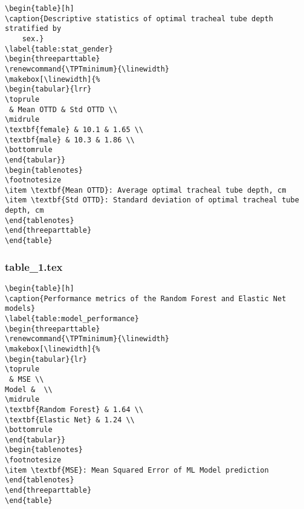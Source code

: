 \documentclass[11pt]{article}
\begin{document}
\begin{Verbatim}[tabsize=4]
\begin{table}[h]
\caption{Descriptive statistics of optimal tracheal tube depth stratified by
	sex.}
\label{table:stat_gender}
\begin{threeparttable}
\renewcommand{\TPTminimum}{\linewidth}
\makebox[\linewidth]{%
\begin{tabular}{lrr}
\toprule
 & Mean OTTD & Std OTTD \\
\midrule
\textbf{female} & 10.1 & 1.65 \\
\textbf{male} & 10.3 & 1.86 \\
\bottomrule
\end{tabular}}
\begin{tablenotes}
\footnotesize
\item \textbf{Mean OTTD}: Average optimal tracheal tube depth, cm
\item \textbf{Std OTTD}: Standard deviation of optimal tracheal tube depth, cm
\end{tablenotes}
\end{threeparttable}
\end{table}

\end{Verbatim}

\subsubsection*{table\_1.tex}

\begin{Verbatim}[tabsize=4]
\begin{table}[h]
\caption{Performance metrics of the Random Forest and Elastic Net models}
\label{table:model_performance}
\begin{threeparttable}
\renewcommand{\TPTminimum}{\linewidth}
\makebox[\linewidth]{%
\begin{tabular}{lr}
\toprule
 & MSE \\
Model &  \\
\midrule
\textbf{Random Forest} & 1.64 \\
\textbf{Elastic Net} & 1.24 \\
\bottomrule
\end{tabular}}
\begin{tablenotes}
\footnotesize
\item \textbf{MSE}: Mean Squared Error of ML Model prediction
\end{tablenotes}
\end{threeparttable}
\end{table}

\end{Verbatim}
\end{document}
